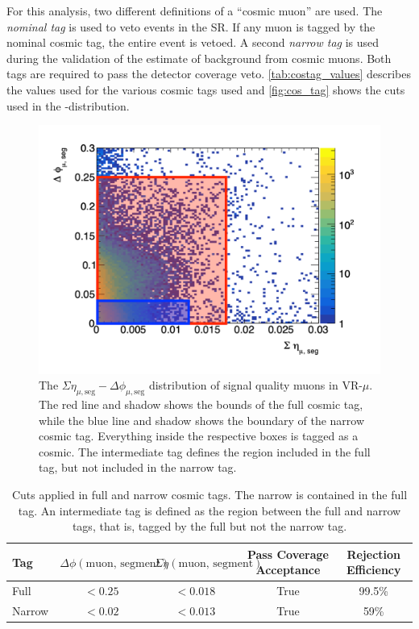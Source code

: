 For this analysis, two different definitions of a ``cosmic muon'' are used. The \emph{nominal tag} is used to veto events in the \ac{SR}. If any muon is tagged by the nominal cosmic tag, the entire event is vetoed. A second \emph{narrow tag} is used during the validation of the estimate of background from cosmic muons. Both tags are required to pass the detector coverage veto. \autoref{tab:costag_values} describes the values used for the various cosmic tags used and \autoref{fig:cos_tag} shows the cuts used in the \dphicos-\sigeta distribution. 

\begin{figure}[htbp]
\centering
\includegraphics[width=.48\textwidth]{figures/cosmics/cosmic_tag.png}
\caption{The $\Sigma\eta_{\mu,\textrm{seg}} - \Delta\phi_{\mu,\textrm{seg}}$ distribution of signal quality muons in VR-$\mu$. The red line and shadow shows the bounds of the full cosmic tag, while the blue line and shadow shows the boundary of the narrow cosmic tag. Everything inside the respective boxes is tagged as a cosmic. The intermediate tag defines the region included in the full tag, but not included in the narrow tag.}
\label{fig:cos_tag}
\end{figure}

\begin{table}
\centering
\begin{tabular}{lcccc}
Tag & $\Delta \phi (\textrm{muon, segment})$ & $\Sigma \eta (\textrm{muon, segment})$ & Pass Coverage Acceptance & Rejection Efficiency\\
\hline
Full   & $<0.25$   & $ <0.018 $   & True & 99.5\% \\
Narrow & $<0.02$   & $ <0.013$    & True & 59\% \\
\hline
\end{tabular}
\caption{Cuts applied in full and narrow cosmic tags. The narrow is contained in the full tag. An intermediate tag is defined as the region between the full and narrow tags, that is, tagged by the full but not the narrow tag.}
\label{tab:costag_values}
\end{table}

